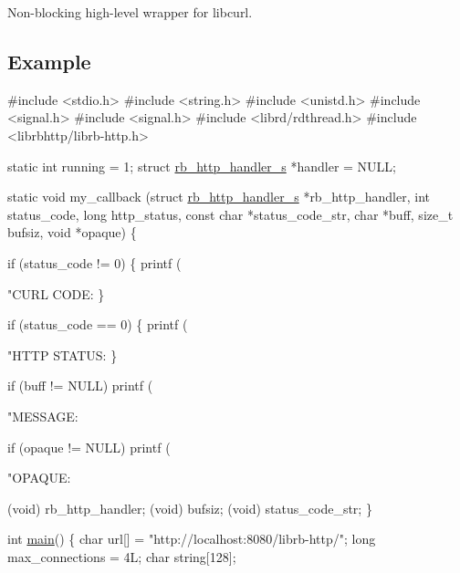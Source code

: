 Non-\/blocking high-\/level wrapper for libcurl.

\subsection*{Example}


\begin{DoxyCode}
\textcolor{preprocessor}{#include <stdio.h>}
\textcolor{preprocessor}{#include <string.h>}
\textcolor{preprocessor}{#include <unistd.h>}
\textcolor{preprocessor}{#include <signal.h>}
\textcolor{preprocessor}{#include <signal.h>}
\textcolor{preprocessor}{#include <librd/rdthread.h>}
\textcolor{preprocessor}{#include <librbhttp/librb-http.h>}

\textcolor{keyword}{static} \textcolor{keywordtype}{int} running = 1;
\textcolor{keyword}{struct }\hyperlink{structrb__http__handler__s}{rb\_http\_handler\_s} *handler = NULL;

\textcolor{keyword}{static} \textcolor{keywordtype}{void} my\_callback (\textcolor{keyword}{struct} \hyperlink{structrb__http__handler__s}{rb\_http\_handler\_s} *rb\_http\_handler,
                         \textcolor{keywordtype}{int} status\_code,
                         \textcolor{keywordtype}{long} http\_status,
                         \textcolor{keyword}{const} \textcolor{keywordtype}{char} *status\_code\_str,
                         \textcolor{keywordtype}{char} *buff,
                         \textcolor{keywordtype}{size\_t} bufsiz,
                         \textcolor{keywordtype}{void} *opaque) \{

    \textcolor{keywordflow}{if} (status\_code != 0) \{
        printf (\textcolor{stringliteral}{"CURL CODE: %
    \}

    \textcolor{keywordflow}{if} (status\_code == 0) \{
        printf (\textcolor{stringliteral}{"HTTP STATUS: %
    \}

    \textcolor{keywordflow}{if} (buff != NULL)
        printf (\textcolor{stringliteral}{"MESSAGE: %

    \textcolor{keywordflow}{if} (opaque != NULL)
        printf (\textcolor{stringliteral}{"OPAQUE: %

    (void) rb\_http\_handler;
    (void) bufsiz;
    (void) status\_code\_str;
\}

\textcolor{keywordtype}{int} \hyperlink{rb__http__handler__example_8c_ae66f6b31b5ad750f1fe042a706a4e3d4}{main}() \{
    \textcolor{keywordtype}{char} url[] = \textcolor{stringliteral}{"http://localhost:8080/librb-http/"};
    \textcolor{keywordtype}{long} max\_connections = 4L;
    \textcolor{keywordtype}{char} \textcolor{keywordtype}{string}[128];

}}}}
\end{DoxyCode}
